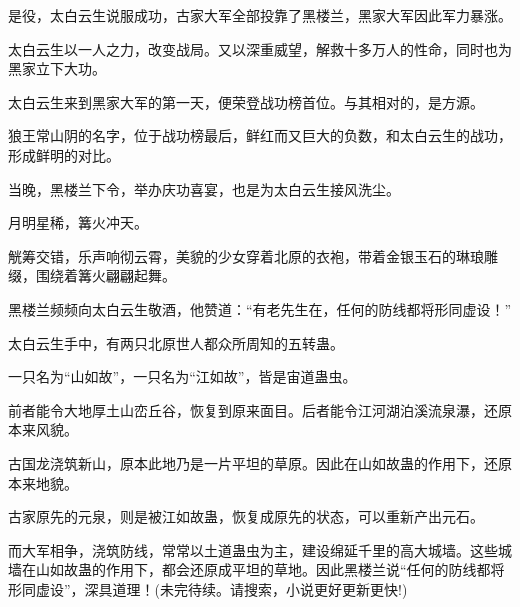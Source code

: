 \begin{this_body}
是役，太白云生说服成功，古家大军全部投靠了黑楼兰，黑家大军因此军力暴涨。

太白云生以一人之力，改变战局。又以深重威望，解救十多万人的性命，同时也为黑家立下大功。

太白云生来到黑家大军的第一天，便荣登战功榜首位。与其相对的，是方源。

狼王常山阴的名字，位于战功榜最后，鲜红而又巨大的负数，和太白云生的战功，形成鲜明的对比。

当晚，黑楼兰下令，举办庆功喜宴，也是为太白云生接风洗尘。

月明星稀，篝火冲天。

觥筹交错，乐声响彻云霄，美貌的少女穿着北原的衣袍，带着金银玉石的琳琅雕缀，围绕着篝火翩翩起舞。

黑楼兰频频向太白云生敬酒，他赞道：“有老先生在，任何的防线都将形同虚设！”

太白云生手中，有两只北原世人都众所周知的五转蛊。

一只名为“山如故”，一只名为“江如故”，皆是宙道蛊虫。

前者能令大地厚土山峦丘谷，恢复到原来面目。后者能令江河湖泊溪流泉瀑，还原本来风貌。

古国龙浇筑新山，原本此地乃是一片平坦的草原。因此在山如故蛊的作用下，还原本来地貌。

古家原先的元泉，则是被江如故蛊，恢复成原先的状态，可以重新产出元石。

而大军相争，浇筑防线，常常以土道蛊虫为主，建设绵延千里的高大城墙。这些城墙在山如故蛊的作用下，都会还原成平坦的草地。因此黑楼兰说“任何的防线都将形同虚设”，深具道理！(未完待续。请搜索，小说更好更新更快!)

\end{this_body}

